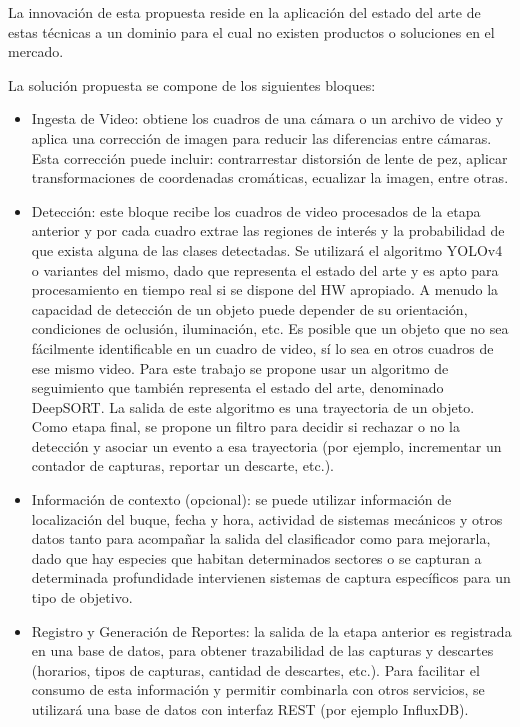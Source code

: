 \documentclass[11pt]{charter}
\begin{document}
La innovación de esta propuesta reside en la aplicación del estado del arte de estas técnicas a un dominio para el cual no existen productos o soluciones en el mercado.

La solución propuesta se compone de los siguientes bloques:

\begin{itemize}
\item Ingesta de Video: obtiene los cuadros de una cámara o un archivo de video y aplica una corrección de imagen para reducir las diferencias entre cámaras. Esta corrección puede incluir: contrarrestar distorsión de lente de pez, aplicar transformaciones de coordenadas cromáticas, ecualizar la imagen, entre otras.

\item Detección: este bloque recibe los cuadros de video procesados de la etapa anterior y por cada cuadro extrae las regiones de interés y la probabilidad de que exista alguna de las clases detectadas. Se utilizará el algoritmo YOLOv4 o variantes del mismo, dado que representa el estado del arte y es apto para procesamiento en tiempo real si se dispone del HW apropiado. A menudo la capacidad de detección de un objeto puede depender de su orientación, condiciones de oclusión, iluminación, etc. Es posible que un objeto que no sea fácilmente identificable en un cuadro de video, sí lo sea en otros cuadros de ese mismo video. Para este trabajo se propone usar un algoritmo de seguimiento que también representa el estado del arte, denominado DeepSORT. La salida de este algoritmo es una trayectoria de un objeto. Como etapa final, se propone un filtro para decidir si rechazar o no la detección y asociar un evento a esa trayectoria (por ejemplo, incrementar un contador de capturas, reportar un descarte, etc.).

\item Información de contexto (opcional): se puede utilizar información de localización del buque, fecha y hora, actividad de sistemas mecánicos y otros datos tanto para acompañar la salida del clasificador como para mejorarla, dado que hay especies que habitan determinados sectores o se capturan a determinada profundidade intervienen sistemas de captura específicos para un tipo de objetivo.

\item Registro y Generación de Reportes: la salida de la etapa anterior es registrada en una base de datos, para obtener trazabilidad de las capturas y descartes (horarios, tipos de capturas, cantidad de descartes, etc.). Para facilitar el consumo de esta información y permitir combinarla con otros servicios, se utilizará una base de datos con interfaz REST (por ejemplo InfluxDB).
\end{itemize}
\end{document}
